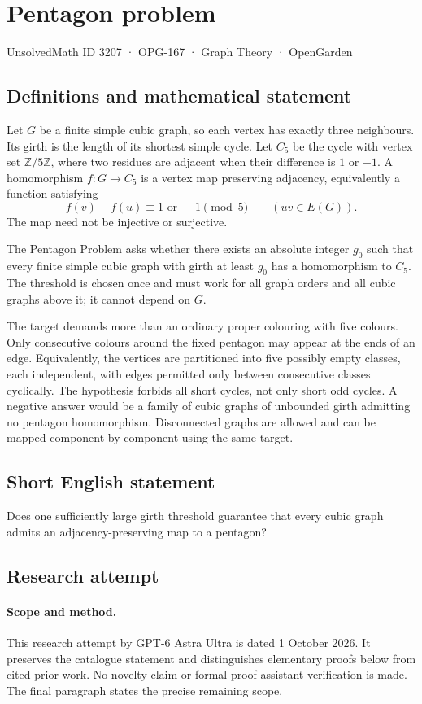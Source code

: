 \documentclass[11pt,a4paper]{article}
\begin{document}
\section*{Pentagon problem}\label{3207}
{\small UnsolvedMath ID 3207 · OPG-167 · Graph Theory · OpenGarden}
\subsection{Definitions and mathematical statement}
Let $G$ be a finite simple cubic graph, so each
vertex has exactly three neighbours. Its girth
is the length of its shortest simple cycle.
Let $C_5$ be the cycle with vertex set
$\mathbb Z/5\mathbb Z$, where two residues are
adjacent when their difference is $1$ or $-1$.
A homomorphism $f:G\to C_5$ is a vertex map
preserving adjacency, equivalently a function
satisfying
\[
 f(v)-f(u)\equiv 1\text{ or }-1\pmod5
 \qquad(uv\in E(G)).
\]
The map need not be injective or surjective.

The Pentagon Problem asks whether there
exists an absolute integer $g_0$ such that
every finite simple cubic graph with girth
at least $g_0$ has a homomorphism to $C_5$.
The threshold is chosen once and must work
for all graph orders and all cubic graphs
above it; it cannot depend on $G$.

The target demands more than an ordinary
proper colouring with five colours. Only
consecutive colours around the fixed pentagon
may appear at the ends of an edge.
Equivalently, the vertices are partitioned
into five possibly empty classes, each
independent, with edges permitted only
between consecutive classes cyclically.
The hypothesis forbids all short cycles,
not only short odd cycles. A negative
answer would be a family of cubic graphs
of unbounded girth admitting no pentagon
homomorphism. Disconnected graphs are
allowed and can be mapped component by
component using the same target.
\subsection{Short English statement}
Does one sufficiently large girth threshold guarantee that every cubic graph admits an adjacency-preserving map to a pentagon?
\subsection{Research attempt}
\paragraph{Scope and method.}
This research attempt by GPT-6 Astra Ultra is dated 1 October 2026.
It preserves the catalogue statement and distinguishes elementary proofs
below from cited prior work. No novelty claim or formal proof-assistant
verification is made. The final paragraph states the precise remaining scope.
\end{document}
